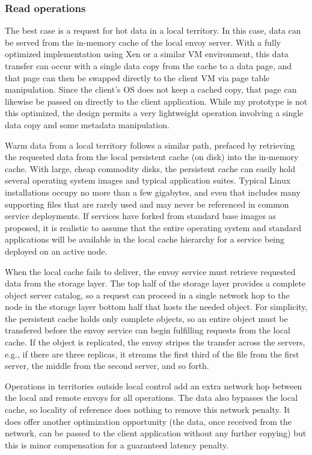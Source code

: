 \subsubsection{Read operations}\label{sec:data-paths-read}

The best case is a request for hot data in a local territory. In this case, data can be served from the in-memory cache of the local envoy server. With a fully optimized implementation using Xen or a similar VM environment, this data transfer can occur with a single data copy from the cache to a data page, and that page can then be swapped directly to the client VM via page table manipulation. Since the client's OS does not keep a cached copy, that page can likewise be passed on directly to the client application. While my prototype is not this optimized, the design permits a very lightweight operation involving a single data copy and some metadata manipulation.

Warm data from a local territory follows a similar path, prefaced by retrieving the requested data from the local persistent cache (on disk) into the in-memory cache. With large, cheap commodity disks, the persistent cache can easily hold several operating system images and typical application suites. Typical Linux installations occupy no more than a few gigabytes, and even that includes many supporting files that are rarely used and may never be referenced in common service deployments. If services have forked from standard base images as proposed, it is realistic to assume that the entire operating system and standard applications will be available in the local cache hierarchy for a service being deployed on an active node.

When the local cache fails to deliver, the envoy service must retrieve requested data from the storage layer. The top half of the storage layer provides a complete object server catalog, so a request can proceed in a single network hop to the node in the storage layer bottom half that hosts the needed object. For simplicity, the persistent cache holds only complete objects, so an entire object must be transfered before the envoy service can begin fulfilling requests from the local cache. If the object is replicated, the envoy stripes the transfer across the servers, e.g., if there are three replicas, it streams the first third of the file from the first server, the middle from the second server, and so forth.

Operations in territories outside local control add an extra network hop between the local and remote envoys for all operations. The data also bypasses the local cache, so locality of reference does nothing to remove this network penalty. It does offer another optimization opportunity (the data, once received from the network, can be passed to the client application without any further copying) but this is minor compensation for a guaranteed latency penalty.

